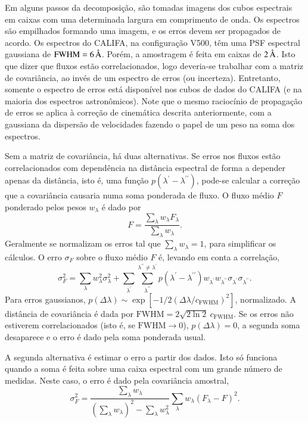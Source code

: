 Em alguns passos da decomposição, são tomadas imagens dos cubos espectrais em
caixas com uma determinada largura em comprimento de onda. Os espectros são
empilhados formando uma imagem, e os erros devem ser propagados de acordo. Os
espectros do CALIFA, na configuração V500, têm uma PSF espectral gaussiana de
$\mathrm{FWHM}=6\,\text{\normalfont\AA}$. Porém, a amostragem é feita em caixas de
$2\,\text{\normalfont\AA}$. Isto que dizer que fluxos estão correlacionados, logo deveria-se
trabalhar com a matriz de covariância, ao invés de um espectro de erros (ou
incerteza). Entretanto, somente o espectro de erros está disponível nos cubos de
dados do CALIFA (e na maioria dos espectros astronômicos). Note que o mesmo
raciocínio de propagação de erros se aplica à correção de cinemática descrita
anteriormente, com a gaussiana da dispersão de velocidades fazendo o papel de um
peso na soma dos espectros.

Sem a matriz de covariância, há duas alternativas. Se erros nos fluxos estão
correlacionados com dependência na distância espectral de forma a depender
apenas da distância, isto é, uma função $p(\lambda^\prime -
\lambda^{\prime\prime})$, pode-se calcular a correção que a covariância causaria
numa soma ponderada de fluxo. O fluxo médio $F$ ponderado pelos pesos
$w_\lambda$ é dado por
\begin{equation*}
F = \frac{\sum\limits_\lambda w_\lambda F_\lambda}{\sum\limits_\lambda
w_\lambda}.
\end{equation*}
Geralmente se normalizam os erros tal que $\sum\limits_\lambda
w_\lambda = 1$, para simplificar os cálculos. O erro $\sigma_F$ sobre o fluxo
médio $F$ é, levando em conta a correlação,
\begin{equation*}
\sigma_F^2 = \sum\limits_\lambda w_\lambda^2 \sigma_\lambda^2 +
\sum\limits_{\lambda^\prime}
\sum\limits_{\lambda^{\prime\prime}}^{\lambda^{\prime\prime} \neq
\lambda^\prime} p(\lambda^\prime - \lambda^{\prime\prime}) w_{\lambda^\prime}
w_{\lambda^{\prime\prime}} \sigma_{\lambda^\prime}
\sigma_{\lambda^{\prime\prime}}.
\end{equation*}
Para erros gaussianos, $p(\Delta \lambda) \sim \exp\left[-1/2
(\Delta\lambda / c_\mathrm{FWHM})^2\right]$, normalizado. A distância de
covariância é dada por $\mathrm{FWHM} = 2 \sqrt{2 \ln 2}\ c_\mathrm{FWHM}$. Se
os erros não estiverem correlacionados (isto é, se $\mathrm{FWHM} \to 0$),
$p(\Delta \lambda) = 0$, a segunda soma desaparece e o erro é dado pela soma
ponderada usual.

A segunda alternativa é estimar o erro a partir dos dados. Isto só funciona
quando a soma é feita sobre uma caixa espectral com um grande número de medidas.
Neste caso, o erro é dado pela covariância amostral,
\begin{equation*}
\sigma_F^2 = \dfrac{\sum\limits_\lambda w_\lambda}{\left(\sum\limits_\lambda
w_\lambda\right)^2 - \sum\limits_\lambda w_\lambda^2} \sum\limits_\lambda
w_\lambda \left(F_\lambda - F\right)^2.
\end{equation*}

